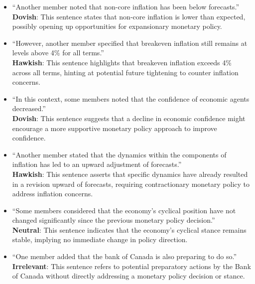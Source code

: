 \begin{itemize}
    \item ``Another member noted that non-core inflation has been below forecasts.''\\ 
    \textbf{Dovish}: This sentence states that non-core inflation is lower than expected, possibly opening up opportunities for expansionary monetary policy.
    
    \item ``However, another member specified that breakeven inflation still remains at levels above 4\% for all terms.''\\ 
    \textbf{Hawkish}: This sentence highlights that breakeven inflation exceeds 4\% across all terms, hinting at potential future tightening to counter inflation concerns.
    
    \item ``In this context, some members noted that the confidence of economic agents decreased.''\\ 
    \textbf{Dovish}: This sentence suggests that a decline in economic confidence might encourage a more supportive monetary policy approach to improve confidence.

    \item ``Another member stated that the dynamics within the components of inflation has led to an upward adjustment of forecasts.''\\ 
    \textbf{Hawkish}: This sentence asserts that specific dynamics have already resulted in a revision upward of forecasts, requiring contractionary monetary policy to address inflation concerns.
    
    \item ``Some members considered that the economy's cyclical position have not changed significantly since the previous monetary policy decision.''\\ 
    \textbf{Neutral}: This sentence indicates that the economy’s cyclical stance remains stable, implying no immediate change in policy direction.
    
    \item ``One member added that the bank of Canada is also preparing to do so.''\\ 
    \textbf{Irrelevant}: This sentence refers to potential preparatory actions by the Bank of Canada without directly addressing a monetary policy decision or stance.
\end{itemize}


\newpage


